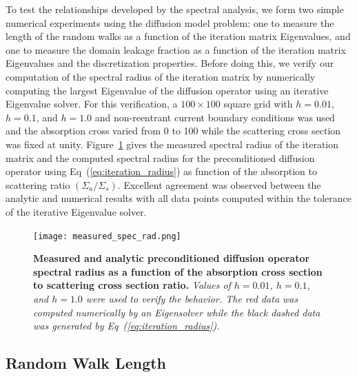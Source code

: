 \documentclass{mc2013}
\begin{document}
To test the relationships developed by the spectral analysis, we form
two simple numerical experiments using the diffusion model problem:
one to measure the length of the random walks as a function of the
iteration matrix Eigenvalues, and one to measure the domain leakage
fraction as a function of the iteration matrix Eigenvalues and the
discretization properties. Before doing this, we verify our
computation of the spectral radius of the iteration matrix by
numerically computing the largest Eigenvalue of the diffusion operator
using an iterative Eigenvalue solver. For this verification, a $100
\times 100$ square grid with $h=0.01$, $h=0.1$, and $h=1.0$ and
non-reentrant current boundary conditions was used and the absorption
cross varied from 0 to 100 while the scattering cross section was
fixed at unity. Figure~\ref{fig:measured_spec_rad} gives the measured
spectral radius of the iteration matrix and the computed spectral
radius for the preconditioned diffusion operator using
Eq~(\ref{eq:iteration_radius}) as function of the absorption to
scattering ratio $(\Sigma_a / \Sigma_s)$. Excellent agreement was
observed between the analytic and numerical results with all data
points computed within the tolerance of the iterative Eigenvalue
solver.
\vspace{16pt}
\begin{figure}[ht!]
\begin{spacing}{1.0}
  \begin{center}
    \texttt{[image: measured\_spec\_rad.png]}
  \end{center}
  \caption{\textbf{Measured and analytic preconditioned diffusion
      operator spectral radius as a function of the absorption cross
      section to scattering cross section ratio.} \textit{Values of
      $h=0.01$, $h=0.1$, and $h=1.0$ were used to verify the
      behavior. The red data was computed numerically by an
      Eigensolver while the black dashed data was generated by
      Eq~(\ref{eq:iteration_radius}).}}
  \label{fig:measured_spec_rad}
\end{spacing}
\end{figure}
\vspace{16pt}

\subsection{Random Walk Length}
\label{subsec:walk_length}
\end{document}
